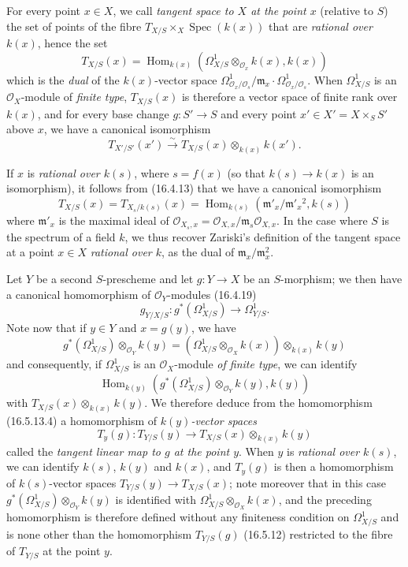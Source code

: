 \begin{env}[16.5.13]\label{IV.16.5.13}
For every point $x\in X$, we call \emph{tangent space to $X$ at the point $x$}
(relative to $S$) the set of points of the fibre
$T_{X/S}\times_X\operatorname{Spec}(k(x))$ that are \emph{rational over $k(x)$},
hence the set
\[
  T_{X/S}(x)=
  \operatorname{Hom}_{k(x)}
  (\Omega_{X/S}^1\otimes_{\mathcal{O}_x}k(x),k(x))
  \tag{16.5.13.1}
  \label{IV.16.5.13.1}
\]
which is the \emph{dual} of the $k(x)$-vector space
$\Omega_{\mathcal{O}_x/\mathcal{O}_s}^1/
\mathfrak{m}_x\cdot\Omega_{\mathcal{O}_x/\mathcal{O}_s}^1$. When
$\Omega_{X/S}^1$ is an $\mathcal{O}_X$-module of \emph{finite type},
$T_{X/S}(x)$ is therefore a vector space of finite rank over $k(x)$, and for
every
base change $g:S'\to S$ and every point
$x'\in X'=X\times_S S'$ above $x$, we have a canonical isomorphism
\[
  T_{X'/S'}(x')\xrightarrow{\sim}
  T_{X/S}(x)\otimes_{k(x)}k(x').
  \tag{16.5.13.2}
  \label{IV.16.5.13.2}
\]

If $x$ is \emph{rational over $k(s)$}, where $s=f(x)$ (so that
$k(s)\to k(x)$ is an isomorphism), it follows from (16.4.13) that we have a
canonical isomorphism
\[
  T_{X/S}(x)=T_{X_s/k(s)}(x)
  =\operatorname{Hom}_{k(s)}
  (\mathfrak{m}'_x/\mathfrak{m}'_x{}^2,k(s))
  \tag{16.5.13.3}
  \label{IV.16.5.13.3}
\]
where $\mathfrak{m}'_x$ is the maximal ideal of
$\mathcal{O}_{X_s,x}=\mathcal{O}_{X,x}/
\mathfrak{m}_s\mathcal{O}_{X,x}$. In the case where $S$ is the spectrum of a
field $k$, we thus recover Zariski's definition of the tangent space at a
point $x\in X$ \emph{rational over $k$}, as the dual of
$\mathfrak{m}_x/\mathfrak{m}_x^2$.

Let $Y$ be a second $S$-prescheme and let $g:Y\to X$ be an $S$-morphism; we
then have a canonical homomorphism of $\mathcal{O}_Y$-modules (16.4.19)
\[
  g_{Y/X/S}:g^*(\Omega_{X/S}^1)\longrightarrow\Omega_{Y/S}^1.
  \tag{16.5.13.4}
  \label{IV.16.5.13.4}
\]
Note now that if $y\in Y$ and $x=g(y)$, we have
\[
  g^*(\Omega_{X/S}^1)\otimes_{\mathcal{O}_Y}k(y)
  =(\Omega_{X/S}^1\otimes_{\mathcal{O}_X}k(x))
  \otimes_{k(x)}k(y)
\]
and consequently, if $\Omega_{X/S}^1$ is an $\mathcal{O}_X$-module
\emph{of finite type}, we can identify
\[
  \operatorname{Hom}_{k(y)}
  (g^*(\Omega_{X/S}^1)\otimes_{\mathcal{O}_Y}k(y),k(y))
\]
with $T_{X/S}(x)\otimes_{k(x)}k(y)$. We therefore deduce from the homomorphism
(16.5.13.4) a homomorphism of \emph{$k(y)$-vector spaces}
\[
  T_y(g):T_{Y/S}(y)\longrightarrow
  T_{X/S}(x)\otimes_{k(x)}k(y)
  \tag{16.5.13.5}
  \label{IV.16.5.13.5}
\]
called the \emph{tangent linear map to $g$ at the point $y$}. When $y$ is
\emph{rational over $k(s)$}, we can identify $k(s)$, $k(y)$ and $k(x)$, and
$T_y(g)$ is then a homomorphism of $k(s)$-vector spaces
$T_{Y/S}(y)\to T_{X/S}(x)$; note moreover that in this case
$g^*(\Omega_{X/S}^1)\otimes_{\mathcal{O}_Y}k(y)$ is identified with
$\Omega_{X/S}^1\otimes_{\mathcal{O}_X}k(x)$, and the preceding homomorphism is
therefore defined without any finiteness condition on $\Omega_{X/S}^1$ and is
none other than the homomorphism $T_{Y/S}(g)$ (16.5.12) restricted to the fibre
of $T_{Y/S}$ at the point $y$.
\end{env}

